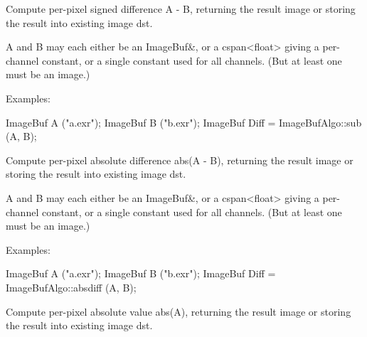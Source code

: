  

Compute per-pixel signed difference {\cf A - B}, returning the result image
or storing the result into existing image {\cf dst}.

{\cf A} and {\cf B} may each either be an {\cf ImageBuf\&}, or a
{\cf cspan<float>} giving a per-channel constant, or a single constant used
for all channels. (But at least one must be an image.)

\smallskip
\noindent Examples:
\begin{code}
    ImageBuf A ("a.exr");
    ImageBuf B ("b.exr");
    ImageBuf Diff = ImageBufAlgo::sub (A, B);
\end{code}
\apiend


 

Compute per-pixel absolute difference {\cf abs(A - B)}, returning the result image
or storing the result into existing image {\cf dst}.

{\cf A} and {\cf B} may each either be an {\cf ImageBuf\&}, or a
{\cf cspan<float>} giving a per-channel constant, or a single constant used
for all channels. (But at least one must be an image.)

\smallskip
\noindent Examples:
\begin{code}
    ImageBuf A ("a.exr");
    ImageBuf B ("b.exr");
    ImageBuf Diff = ImageBufAlgo::absdiff (A, B);
\end{code}
\apiend


 

Compute per-pixel absolute value {\cf abs(A)}, returning the result image
or storing the result into existing image {\cf dst}.


